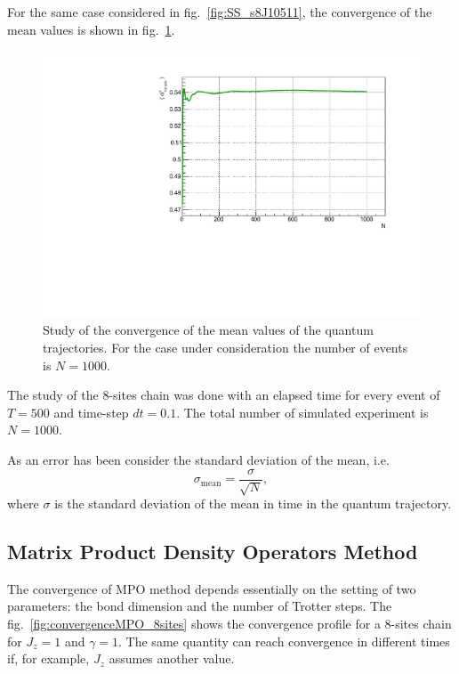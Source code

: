 For the same case considered in fig.~\ref{fig:SS_s8J10511}, the convergence of the mean values is shown in fig.~\ref{fig:Convergence_s8J10511}. 

\begin{figure}[H]
    \centering
    \includegraphics[scale=0.7]{Figures/Convergence_s8J10511.pdf}
    \caption{Study of the convergence of the mean values of the quantum trajectories. For the case under consideration the number of events is $N = 1000$.}
    \label{fig:Convergence_s8J10511}
\end{figure}

The study of the 8-sites chain was done with an elapsed time for every event of $T = 500$ and time-step $dt = 0.1$. The total number of simulated experiment is $N = 1000$.

As an error has been consider the standard deviation of the mean, i.e.
\begin{equation*}
    \sigma_{\text{mean}} = \frac{\sigma}{\sqrt{N}},
\end{equation*}
where $\sigma$ is the standard deviation of the mean in time in the quantum trajectory.

\subsection{Matrix Product Density Operators Method}
The convergence of MPO method depends essentially on the setting of two parameters: the bond dimension and the number of Trotter steps. The fig.~\ref{fig:convergenceMPO_8sites} shows the convergence profile for a 8-sites chain for $J_z = 1$ and $\gamma = 1$. The same quantity can reach convergence in different times if, for example, $J_z$ assumes another value. 

